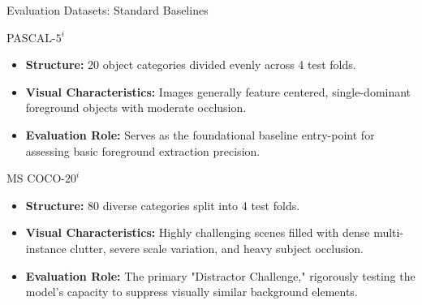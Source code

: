 \documentclass[aspectratio=169, 10pt]{beamer}
\begin{document}
\begin{frame}{Evaluation Datasets: Standard Baselines}
    \begin{block}{PASCAL-$5^i$ \cite{shaban2017one}}
        \begin{itemize}
            \item \textbf{Structure:} 20 object categories divided evenly across 4 test folds.
            \item \textbf{Visual Characteristics:} Images generally feature centered, single-dominant foreground objects with moderate occlusion.
            \item \textbf{Evaluation Role:} Serves as the foundational baseline entry-point for assessing basic foreground extraction precision.
        \end{itemize}
    \end{block}

    \begin{block}{MS COCO-$20^i$ \cite{nguyen2019feature}}
        \begin{itemize}
            \item \textbf{Structure:} 80 diverse categories split into 4 test folds.
            \item \textbf{Visual Characteristics:} Highly challenging scenes filled with dense multi-instance clutter, severe scale variation, and heavy subject occlusion.
            \item \textbf{Evaluation Role:} The primary "Distractor Challenge," rigorously testing the model's capacity to suppress visually similar background elements.
        \end{itemize}
    \end{block}
\end{frame}
\end{document}
